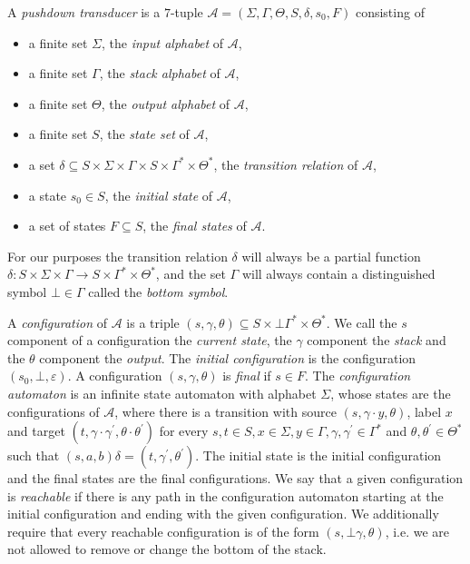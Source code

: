 A \emph{pushdown transducer} is a $7$-tuple $\mathcal{A} = (\Sigma, \Gamma, \Theta, S, \delta, s_0, F)$ consisting
of
\begin{itemize}
  \item a finite set $\Sigma$, the \emph{input alphabet} of $\mathcal{A}$,
  \item a finite set $\Gamma$, the \emph{stack alphabet} of $\mathcal{A}$,
  \item a finite set $\Theta$, the \emph{output alphabet} of $\mathcal{A}$,
  \item a finite set $S$, the \emph{state set} of $\mathcal{A}$,
  \item a set $\delta \subseteq S \times \Sigma \times \Gamma \times S \times \Gamma^\ast \times \Theta^\ast$,
        the \emph{transition relation} of $\mathcal{A}$,
  \item a state $s_0 \in S$, the \emph{initial state} of $\mathcal{A}$,
  \item a set of states $F\subseteq S$, the \emph{final states} of $\mathcal{A}$.
\end{itemize}
For our purposes the transition relation $\delta$ will always be a partial function
$\delta: S\times \Sigma \times \Gamma \rightarrow S\times \Gamma^\ast \times \Theta^\ast$,
and the set $\Gamma$ will always contain a distinguished symbol $\bot\in \Gamma$ called the \emph{bottom symbol}.

A \emph{configuration} of $\mathcal{A}$ is a triple
$(s, \gamma, \theta) \subseteq S\times \bot\Gamma^\ast \times \Theta^\ast$.
We call the $s$ component of a configuration the \emph{current state}, the $\gamma$ component the \emph{stack}
and the $\theta$ component the \emph{output}. The \emph{initial configuration} is the configuration
$(s_0, \bot, \varepsilon)$. A configuration $(s, \gamma, \theta)$ is \emph{final} if $s\in F$.
The \emph{configuration automaton} is an infinite state automaton with alphabet $\Sigma$,
whose states are the configurations of
$\mathcal{A}$, where
there is a transition with source $(s, \gamma \cdot y, \theta)$, label $x$ and target
$(t, \gamma \cdot \gamma^\prime, \theta\cdot \theta^\prime)$ for every
$s, t\in S, x\in \Sigma, y\in \Gamma, \gamma, \gamma^\prime \in \Gamma^\ast$ and $\theta, \theta^\prime \in \Theta^\ast$
such that $(s, a, b)\delta = (t, \gamma^\prime, \theta^\prime)$.
The initial state is the initial configuration and the final states are the final configurations.
We say that a given configuration is \emph{reachable} if there is any path in the configuration automaton starting at
the initial configuration and ending with the given configuration.
We additionally require that every reachable configuration is of the form $(s, \bot \gamma, \theta)$, i.e.
we are not allowed to remove or change the bottom of the stack.

